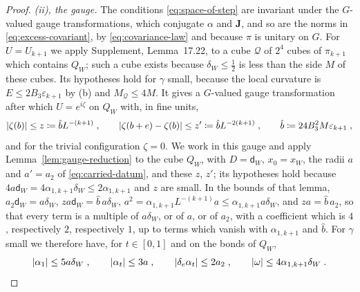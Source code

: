 \documentclass[11pt]{preprint}
\DeclarePairedDelimiter{\abs}{\lvert}{\rvert}
\numberwithin{equation}{section}
\theoremstyle{definition}
\theoremstyle{remark}
\theoremstyle{plain}
\begin{document}
\begin{proof}
\emph{(ii), the gauge.} The conditions \eqref{eq:space-of-step} are invariant under the $G$-valued gauge transformations, which conjugate $\alpha$ and $\mathbf J$, and so are the norms in \eqref{eq:excess-covariant}, by \eqref{eq:covariance-law} and because $\pi$ is unitary on $G$. For $U = U_{k+1}$ we apply Supplement, Lemma~17.22, to a cube $\mathcal Q$ of $2^4$ cubes of $\pi_{k+1}$ which contains $Q_W$; such a cube exists because $\delta_W \leq \frac12$ is less than the side $M$ of these cubes. Its hypotheses hold for $\gamma$ small, because the local curvature is $E \leq 2B_3\varepsilon_{k+1}$ by (b) and $M_{\mathcal Q} \leq 4M$. It gives a $G$-valued gauge transformation after which $U = e^{i\zeta}$ on $Q_W$ with, in fine units,
\[
    \abs{\zeta(b)} \leq z \coloneqq \hat bL^{-(k+1)}\;,
    \qquad
    \abs{\zeta(b + e) - \zeta(b)} \leq z' \coloneqq \hat bL^{-2(k+1)}\;,
    \qquad
    \hat b \coloneqq 24B_3^2M\varepsilon_{k+1}\;,
\]
and for the trivial configuration $\zeta = 0$. We work in this gauge and apply Lemma~\ref{lem:gauge-reduction} to the cube $Q_W$, with $D = \mathsf d_W$, $x_0 = x_W$, the radii $a$ and $a' = a_2$ of \eqref{eq:carried-datum}, and these $z$, $z'$; its hypotheses hold because $4a\mathsf d_W = 4\alpha_{1,k+1}\delta_W \leq 2\alpha_{1,k+1}$ and $z$ are small. In the bounds of that lemma, $a_2\mathsf d_W = a\delta_W$, $za\mathsf d_W = \hat b\,a\delta_W$, $a^2 = \alpha_{1,k+1}L^{-(k+1)}a \leq \alpha_{1,k+1}a\delta_W$, and $za = \hat b\,a_2$, so that every term is a multiple of $a\delta_W$, or of $a$, or of $a_2$, with a coefficient which is $4$, respectively $2$, respectively $1$, up to terms which vanish with $\alpha_{1,k+1}$ and $\hat b$. For $\gamma$ small we therefore have, for $t \in [0, 1]$ and on the bonds of $Q_W$,
\begin{equation}\label{eq:reduced-datum}
    \abs{\alpha_1} \leq 5a\delta_W\;,
    \qquad
    \abs{\alpha_t} \leq 3a\;,
    \qquad
    \abs{\delta_e\alpha_t} \leq 2a_2\;,
    \qquad
    \abs\omega \leq 4\alpha_{1,k+1}\delta_W\;.
\end{equation}


\end{proof}
\end{document}
